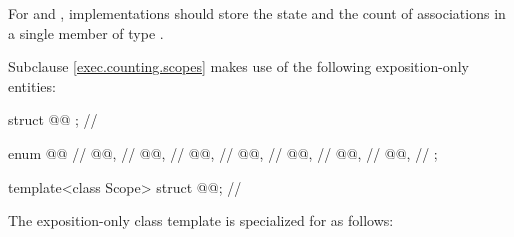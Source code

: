 \pnum
\recommended
For  and ,
implementations should store the state and the count of associations
in a single member of type .

\pnum
Subclause \ref{exec.counting.scopes} makes use of
the following exposition-only entities:

\begin{codeblock}
struct @@ {};     // \expos

enum @@ {     // \expos
  @@,                   // \expos
  @@,                     // \expos
  @@,                   // \expos
  @@,         // \expos
  @@,       // \expos
  @@,        // \expos
  @@,                   // \expos
};

template<class Scope>
  struct @@;     // \expos
\end{codeblock}

\pnum
The exposition-only class template 
is specialized for  as follows:

